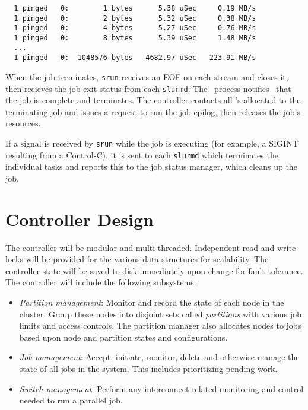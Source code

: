 \begin{verbatim}
  1 pinged   0:        1 bytes      5.38 uSec     0.19 MB/s                     
  1 pinged   0:        2 bytes      5.32 uSec     0.38 MB/s                     
  1 pinged   0:        4 bytes      5.27 uSec     0.76 MB/s                     
  1 pinged   0:        8 bytes      5.39 uSec     1.48 MB/s                     
  ...
  1 pinged   0:  1048576 bytes   4682.97 uSec   223.91 MB/s              
\end{verbatim}

When the job terminates, {\tt srun} receives an EOF on each stream and
closes it, then recieves the job exit status from each {\tt slurmd}.
The \srun\ process notifies \slurmctld\ that the job is complete 
and terminates. The controller contacts all \slurmd 's allocated to the
terminating job and issues a request to run the job epilog, then releases
the job's resources.

If a signal is received by {\tt srun} while the job is executing (for example,
a SIGINT resulting from a Control-C), it is sent to each {\tt slurmd} which 
terminates the individual tasks and reports this to the job status manager,
which cleans up the job.

\section{Controller Design}

The controller will be modular and multi-threaded.  Independent read
and write locks will be provided for the various data structures for
scalability.  The controller state will be saved to disk immediately
upon change for fault tolerance.  The controller  will include the
following subsystems:

\begin{itemize}
\item {\em Partition management}: Monitor and record the state of each
node in the cluster.  Group these nodes into disjoint sets called {\em
partitions} with various job limits and access controls.  The partition
manager also allocates nodes to jobs based upon node and partition states
and configurations.

\item {\em Job management}: Accept, initiate, monitor, delete and
otherwise manage the state of all jobs in the system. This includes
prioritizing pending work.

\item {\em Switch management}: Perform any interconnect-related monitoring
and control needed to run a parallel job.

\end{itemize}

